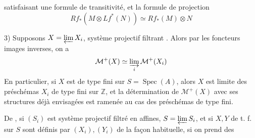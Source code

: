 satisfaisant une formule de transitivité,
et la formule de projection
\[
 Rf_*(M\otimes Lf^*(N))\simeq Rf_*(M)\otimes N
\]

3) Supposons $X=\varprojlim X_i$, système projectif
filtrant . Alors par les foncteurs
images inverses, on a
\[
 \mathcal{M}^+(X)\simeq\varinjlim_i \mathcal{M}^+(X_i)
\]
En particulier, si $X$ est de type fini
sur $S=\operatorname{Spec}(A)$, alors $X$ est limite des
préschémas $X_i$ de type fini sur $\mathbb{Z}$, et
la détermination de $\mathcal{M}^+(X)$ avec ses
structures déjà envisagées est  ramenée
au cas des préschémas de type fini.

De , si $(S_i)$ est système
projectif filtré en affines, $S=\varprojlim S_i$,
et si $X,Y$ de t. f. sur $S$ sont
définis par $(X_i),(Y_i)$ de la
façon habituelle, si on prend des
